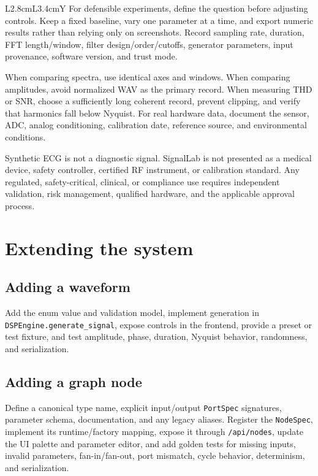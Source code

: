 \documentclass[10pt,a4paper]{article}
\newcommand{\code}[1]{\nolinkurl{#1}}
\begin{document}
\begin{tabularx}{\textwidth}{L{2.8cm}L{3.4cm}Y}
For defensible experiments, define the question before adjusting controls. Keep a fixed baseline, vary one parameter at a time, and export numeric results rather than relying only on screenshots. Record sampling rate, duration, FFT length/window, filter design/order/cutoffs, generator parameters, input provenance, software version, and trust mode.

When comparing spectra, use identical axes and windows. When comparing amplitudes, avoid normalized WAV as the primary record. When measuring THD or SNR, choose a sufficiently long coherent record, prevent clipping, and verify that harmonics fall below Nyquist. For real hardware data, document the sensor, ADC, analog conditioning, calibration date, reference source, and environmental conditions.

\begin{warningbox}[title={Safety and regulated use}]
Synthetic ECG is not a diagnostic signal. SignalLab is not presented as a medical device, safety controller, certified RF instrument, or calibration standard. Any regulated, safety-critical, clinical, or compliance use requires independent validation, risk management, qualified hardware, and the applicable approval process.
\end{warningbox}

\section{Extending the system}

\subsection{Adding a waveform}

Add the enum value and validation model, implement generation in \code{DSPEngine.generate\_signal}, expose controls in the frontend, provide a preset or test fixture, and test amplitude, phase, duration, Nyquist behavior, randomness, and serialization.

\subsection{Adding a graph node}

Define a canonical type name, explicit input/output \code{PortSpec} signatures, parameter schema, documentation, and any legacy aliases. Register the \code{NodeSpec}, implement its runtime/factory mapping, expose it through \code{/api/nodes}, update the UI palette and parameter editor, and add golden tests for missing inputs, invalid parameters, fan-in/fan-out, port mismatch, cycle behavior, determinism, and serialization.


\end{tabularx}
\end{document}
